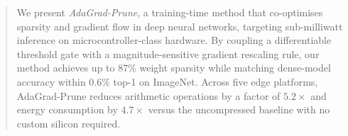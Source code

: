\documentclass[10pt,twocolumn]{article}
\begin{document}

\maketitleblock

\begin{abstract}
We present \textit{AdaGrad-Prune}, a training-time method that co-optimises
sparsity and gradient flow in deep neural networks, targeting sub-milliwatt
inference on microcontroller-class hardware. By coupling a differentiable
threshold gate with a magnitude-sensitive gradient rescaling rule, our method
achieves up to 87\% weight sparsity while matching dense-model accuracy within
0.6\% top-1 on ImageNet. Across five edge platforms, AdaGrad-Prune reduces
arithmetic operations by a factor of $5.2\times$ and energy consumption by
$4.7\times$ versus the uncompressed baseline with no custom silicon required.
\end{abstract}








\end{document}
